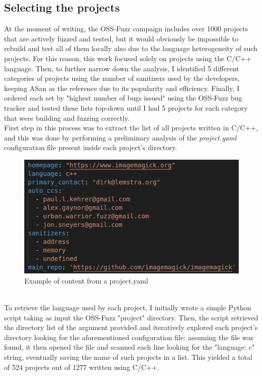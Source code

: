 \subsection{Selecting the projects} \label{selection}
At the moment of writing, the OSS-Fuzz campaign includes over 1000 projects that are actively fuzzed and tested, but it would obviously be impossible to rebuild and test all of them locally also due to the language heterogeneity of such projects.
\newline
For this reason, this work focused solely on projects using the C/C++ language.
\newline
Then, to further narrow down the analysis, I identified 5 different categories of projects using the number of sanitizers used by the developers, keeping ASan as the reference due to its popularity and efficiency.
\newline
Finally, I ordered each set by "highest number of bugs issued" using the OSS-Fuzz bug tracker and tested these lists top-down until I had 5 projects for each category that were building and fuzzing correctly.
\ \\ \newline \newline
First step in this process was to extract the list of all projects written in C/C++, and this was done by performing a preliminary analysis of the \textit{project.yaml} configuration file present inside each project's directory.
\newline
\begin{figure}[h]
\centering
\includegraphics[scale=0.5]{foto/project_yaml.png}
\caption{Example of content from a project.yaml}
\label{fig:project_yaml}
\end{figure}
\ \\
To retrieve the language used by each project, I initially wrote a simple Python script taking as input the OSS-Fuzz "project" directory.
\newline
Then, the script retrieved the directory list of the argument provided and iteratively explored each project's directory looking for the aforementioned configuration file: assuming the file was found, it then opened the file and scanned each line looking for the "language: c" string, eventually saving the name of such projects in a list.
\newline \newline
This yielded a total of 524 projects out of 1277 written using C/C++.


